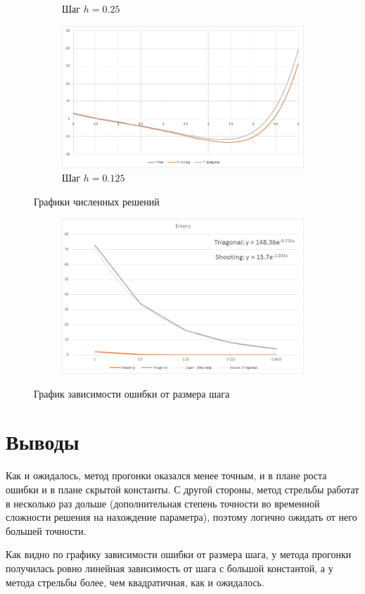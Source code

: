 \documentclass[11pt,a4paper,oneside]{article}
\begin{document}
\begin{figure}[h]
\begin{subfigure}{0.5\textwidth}
		\caption{Шаг $h=0.25$}
	\end{subfigure}
	\begin{subfigure}{0.5\textwidth}
		\centering
		\includegraphics[width=0.9\linewidth]{pics/plot4.png}
		\caption{Шаг $h=0.125$}
	\end{subfigure}
	\caption{Графики численных решений}
\end{figure}

\begin{figure}[h]
	\begin{subfigure}{\textwidth}
		\centering
		\includegraphics[width=0.6\linewidth]{pics/errors.png}
	\end{subfigure}
	\caption{График зависимости ошибки от размера шага}
\end{figure}

\pagebreak
\section{Выводы}

Как и ожидалось, метод прогонки оказался менее точным, и в плане роста ошибки и в плане скрытой константы. С другой стороны, метод стрельбы работат в несколько раз дольше (дополнительная степень точности во временной сложности решения на нахождение параметра), поэтому логично ожидать от него большей точности.

Как видно по графику зависимости ошибки от размера шага, у метода прогонки получилась ровно линейная зависимость от шага с большой константой, а у метода стрельбы более, чем квадратичная, как и ожидалось.
\end{document}
